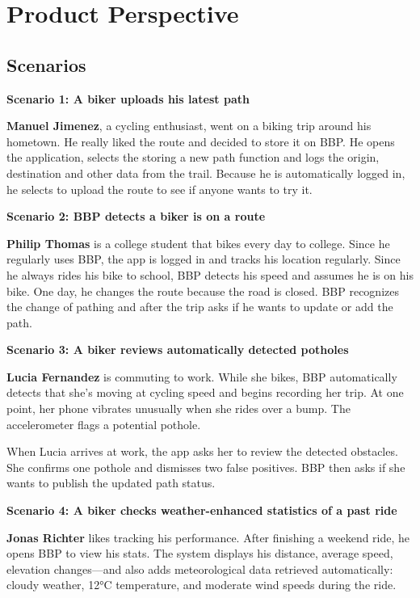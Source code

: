 \section{Product Perspective}
\label{sec:product_perspective}%

\subsection{Scenarios}
\label{subsec:scenarios}%

\textbf{Scenario 1: A biker uploads his latest path}

\textbf{Manuel Jimenez}, a cycling enthusiast, went on a biking trip around his hometown. He really liked the route and decided to store it on BBP. He opens the application, selects the storing a new path function and logs the origin, destination and other data from the trail. Because he is automatically logged in, he selects to upload the route to see if anyone wants to try it.

\bigskip
\textbf{Scenario 2: BBP detects a biker is on a route}

\textbf{Philip Thomas} is a college student that bikes every day to college. Since he regularly uses BBP, the app is logged in and tracks his location regularly. Since he always rides his bike to school, BBP detects his speed and assumes he is on his bike. One day, he changes the route because the road is closed. BBP recognizes the change of pathing and after the trip asks if he wants to update or add the path.

\bigskip
\textbf{Scenario 3: A biker reviews automatically detected potholes}

\textbf{Lucia Fernandez} is commuting to work. While she bikes, BBP automatically detects that she's moving at cycling speed and begins recording her trip. At one point, her phone vibrates unusually when she rides over a bump. The accelerometer flags a potential pothole.

When Lucia arrives at work, the app asks her to review the detected obstacles. She confirms one pothole and dismisses two false positives. BBP then asks if she wants to publish the updated path status.

\bigskip
\textbf{Scenario 4: A biker checks weather-enhanced statistics of a past ride}

\textbf{Jonas Richter} likes tracking his performance. After finishing a weekend ride, he opens BBP to view his stats. The system displays his distance, average speed, elevation changes—and also adds meteorological data retrieved automatically: cloudy weather, 12°C temperature, and moderate wind speeds during the ride.

